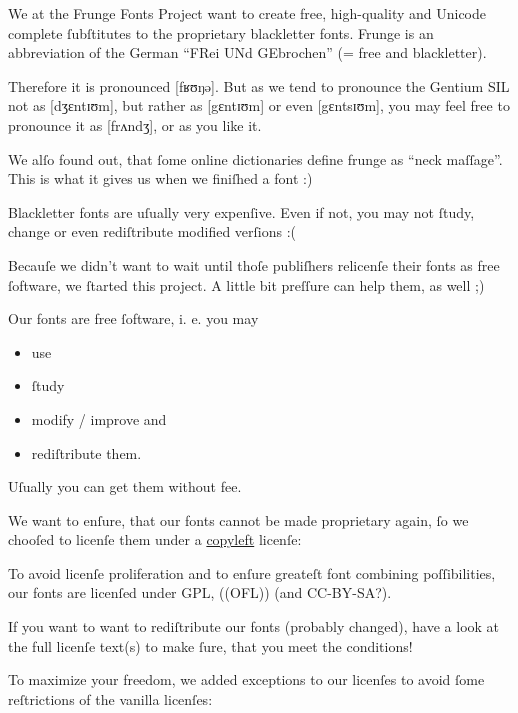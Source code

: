 \documentclass[ngerman,titlepage=on]{scrartcl}
\begin{document}

We at the Frunge Fonts Project want to create free, high-quality and Unicode
complete ſubſtitutes to the proprietary blackletter fonts. Frunge is an
abbreviation of the German “FRei UNd GEbrochen” (= free and blackletter).

Therefore it is pronounced [fʁʊŋə]. But as we tend to pronounce the Gentium SIL
not as [dʒɛntɪʊm], but rather as [gɛntɪʊm] or even [gɛntsɪʊm], you may feel free
to pronounce it as [frʌndʒ], or as you like it.

We alſo found out, that ſome online dictionaries define frunge as “neck
maſſage”. This is what it gives us when we finiſhed a font :)




Blackletter fonts are uſually very expenſive. Even if not, you may not ſtudy,
change or even rediſtribute modified verſions :(

Becauſe we didn’t want to wait until thoſe publiſhers relicenſe their fonts as
free ſoftware, we ſtarted this project. A little bit preſſure can help them, as
well ;)

Our fonts are free ſoftware, i. e. you may

\begin{itemize}
\item use
\item ſtudy
\item modify / improve and
\item rediſtribute them.
\end{itemize}

Uſually you can get them without fee.

We want to enſure, that our fonts cannot be made proprietary again, ſo we
chooſed to licenſe them under a
\href{http://en.wikipedia.org/wiki/Copyleft}{copyleft} licenſe:

To avoid licenſe proliferation and to enſure greateſt font combining
poſſibilities, our fonts are licenſed under GPL, ((OFL)) (and CC-BY-SA?). %

If you want to want to rediſtribute our fonts (probably changed), have a look at
the full licenſe text(s) to make ſure, that you meet the conditions!

To maximize your freedom, we added exceptions to our licenſes to avoid ſome
reſtrictions of the vanilla licenſes:
\end{document}
